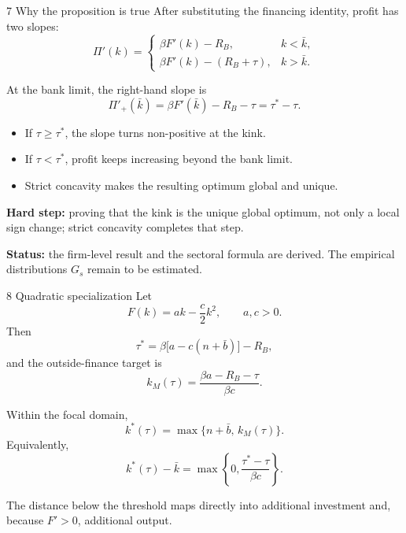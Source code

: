 \documentclass[aspectratio=169,11pt]{beamer}
\newcommand{\Rb}{R_B}
\begin{document}
\begin{frame}{7 \textperiodcentered{} Why the proposition is true}
After substituting the financing identity, profit has two slopes:
\[
\Pi'(k)=
\begin{cases}
\beta F'(k)-\Rb, & k<\bar k,\\
\beta F'(k)-(\Rb+\tau), & k>\bar k.
\end{cases}
\]

At the bank limit, the right-hand slope is
\[
\Pi'_+(\bar k)=\beta F'(\bar k)-\Rb-\tau=\tau^*-\tau.
\]

\begin{itemize}
  \item If $\tau\ge\tau^*$, the slope turns non-positive at the kink.
  \item If $\tau<\tau^*$, profit keeps increasing beyond the bank limit.
  \item Strict concavity makes the resulting optimum global and unique.
\end{itemize}

\vfill
\footnotesize
\textbf{Hard step:} proving that the kink is the unique global optimum, not
only a local sign change; strict concavity completes that step.\par
\textbf{Status:} the firm-level result and the sectoral formula are derived.
The empirical distributions $G_s$ remain to be estimated.
\end{frame}

\begin{frame}{8 \textperiodcentered{} Quadratic specialization}
\small
Let
\[
F(k)=ak-\frac{c}{2}k^2,\qquad a,c>0.
\]
Then
\[
\tau^*=\beta\bigl[a-c(n+\bar b)\bigr]-\Rb,
\]
and the outside-finance target is
\[
k_M(\tau)=\frac{\beta a-\Rb-\tau}{\beta c}.
\]

Within the focal domain,
\[
\boxed{k^*(\tau)=\max\{n+\bar b,\,k_M(\tau)\}}.
\]
Equivalently,
\[
\boxed{k^*(\tau)-\bar k
=\max\left\{0,\frac{\tau^*-\tau}{\beta c}\right\}}.
\]

The distance below the threshold maps directly into additional investment and,
because $F'>0$, additional output.
\end{frame}
\end{document}
